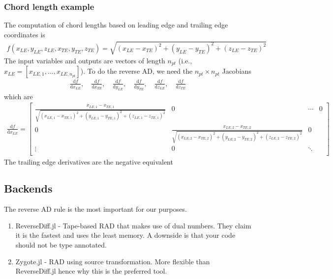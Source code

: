 \documentclass[10pt]{article}
\newcommand{\dd}[2]{\frac{\textrm{d} #1}{\textrm{d} #2}}
\newcommand{\ben}{\begin{eqnarray*}}
\newcommand{\een}{\end{eqnarray*}}
\newcommand{\beq}{\begin{equation}\begin{aligned}}
\newcommand{\eeq}{\end{aligned}\end{equation}}
\begin{document}
\subsubsection{Chord length example}

The computation of chord lengths based on leading edge and trailing edge coordinates is
\beq
f(x_{LE},y_{LE},z_{LE}, x_{TE},y_{TE},z_{TE}) =
\sqrt{
	\left(x_{LE} - x_{TE}\right)^2
	+
	\left(y_{LE} - y_{TE}\right)^2
	+
	\left(z_{LE} - z_{TE}\right)^2
}
\eeq
The input variables and outputs are vectors of length $n_{pt}$ (i.e., $x_{LE} = [x_{LE,1},\dots,x_{LE,n_{pt}}]$).
To do the reverse AD, we need the $n_{pt}\times n_{pt}$ Jacobians
\ben
\dd{f}{x_{LE}},
\quad
\dd{f}{x_{TE}},
\quad
\dd{f}{y_{LE}},
\quad
\dd{f}{y_{TE}},
\quad
\dd{f}{z_{LE}},
\quad
\dd{f}{z_{TE}}
\een
which are
\beq
\dd{f}{x_{LE}} = \begin{bmatrix}
	\frac{ x_{LE,1}-x_{TE,1} }{ \sqrt{ \left( x_{LE,1}-x_{TE,1} \right)^2 + \left( y_{LE,1} - y_{TE,1} \right)^2 + \left( z_{LE,1}-z_{TE,1} \right)^2 }} & 0                                                                                                                                                    & \cdots & 0 \\
	0                                                                                                                                                    & \frac{ x_{LE,2}-x_{TE,2} }{ \sqrt{ \left( x_{LE,2}-x_{TE,2} \right)^2 + \left( y_{LE,2} - y_{TE,2} \right)^2 + \left( z_{LE,2}-z_{TE,2} \right)^2 }} & 0          \\
	\vdots                                                                                                                                               & 0                                                                                                                                                    & \ddots     \\
\end{bmatrix}
\eeq
The trailing edge derivatives are the negative equivalent


\subsection{Backends}

The reverse AD rule is the most important for our purposes.

\begin{enumerate}
	\item ReverseDiff.jl - Tape-based RAD that makes use of dual numbers. They claim it is the fastest and uses the least memory. A downside is that your code should not be type annotated.
	\item Zygote.jl - RAD using source transformation. More flexible than ReverseDiff.jl hence why this is the preferred tool.
\end{enumerate}
\end{document}
